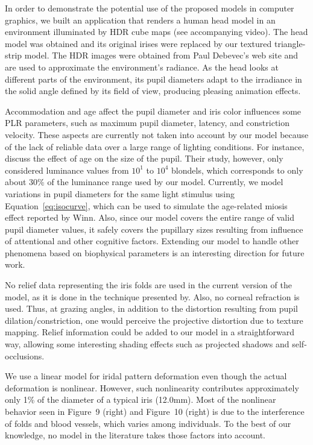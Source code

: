 \documentclass{acmtog}
\begin{document}
In order to demonstrate the potential use of the proposed  models in computer graphics, we built an application that renders a human head model in an environment illuminated by HDR cube maps (see accompanying video). The head model was obtained
 and its original irises were replaced by our textured triangle-strip model. The HDR images
were obtained from Paul Debevec's web site and are used to approximate the environment's radiance.
As the head looks at different parts of the environment, its pupil diameters adapt to the irradiance in the solid angle
defined by its field of view, producing pleasing animation effects. 


Accommodation and age affect the pupil diameter and iris color influences some PLR parameters, such as {maximum} pupil diameter, latency, and constriction velocity. These aspects are currently not taken into account by our model because
of the lack of reliable data over a large range of lighting conditions. For instance, discuss
the effect of age on the size of the pupil. Their study, however, only considered luminance values from $10^1$ to $10^4$
blondels, which corresponds to only about 30\% of the luminance range used by our model. Currently, we model variations in
pupil diameters for the same light stimulus using Equation~\ref{eq:isocurve}, which can be used to simulate the
age-related miosis effect reported by Winn. Also, since our model covers the entire range of valid pupil diameter  values,
it safely covers the pupillary sizes resulting from influence of attentional and other cognitive factors. Extending our
model to handle other phenomena based on biophysical parameters is an interesting direction for future work.

No relief data representing the iris folds are used in the current version of the model, as it is done in the technique presented
by. Also, no corneal refraction is used. Thus, at grazing angles, in addition to the distortion
resulting from pupil dilation/constriction, one would perceive the projective distortion due to texture mapping. Relief
information could be added to our model in a straightforward way, allowing some interesting shading effects such as
projected shadows and self-occlusions.

We use a linear model for iridal pattern deformation even though the actual deformation is nonlinear. However, 
such nonlinearity contributes approximately only 1\% of the diameter of a typical iris (12.0mm). Most of the nonlinear behavior seen in Figure~9 (right) and
Figure~10 (right) is due to the interference of folds and blood vessels, which varies among
individuals. To the best of our knowledge, no model in the literature takes those factors into account.
\end{document}
